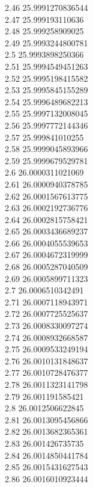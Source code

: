 {2.46	25.9991270836544\\
2.47	25.999193110636\\
2.48	25.999258909025\\
2.49	25.9993244800781\\
2.5	25.9993898250366\\
2.51	25.9994549451263\\
2.52	25.9995198415582\\
2.53	25.9995845155289\\
2.54	25.9996489682213\\
2.55	25.9997132008045\\
2.56	25.9997772144346\\
2.57	25.999841010255\\
2.58	25.9999045893966\\
2.59	25.9999679529781\\
2.6	26.0000311021069\\
2.61	26.0000940378785\\
2.62	26.0001567613775\\
2.63	26.0002192736776\\
2.64	26.0002815758421\\
2.65	26.0003436689237\\
2.66	26.0004055539653\\
2.67	26.0004672319999\\
2.68	26.0005287040509\\
2.69	26.0005899711323\\
2.7	26.0006510342491\\
2.71	26.0007118943971\\
2.72	26.0007725525637\\
2.73	26.0008330097274\\
2.74	26.0008932668587\\
2.75	26.0009533249194\\
2.76	26.0010131848637\\
2.77	26.0010728476377\\
2.78	26.0011323141798\\
2.79	26.001191585421\\
2.8	26.0012506622845\\
2.81	26.0013095456866\\
2.82	26.0013682365361\\
2.83	26.001426735735\\
2.84	26.0014850441784\\
2.85	26.0015431627543\\
2.86	26.0016010923444\\
}
